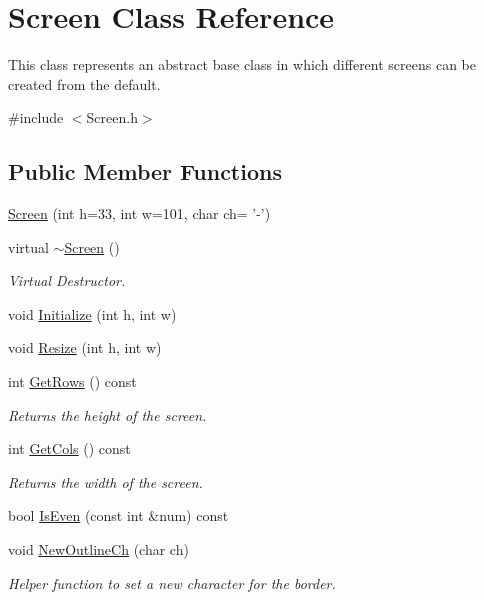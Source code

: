 \hypertarget{classScreen}{\section{Screen Class Reference}
\label{classScreen}
}


This class represents an abstract base class in which different screens can be created from the default.  




{\ttfamily \#include $<$Screen.\-h$>$}

\subsection*{Public Member Functions}
\begin{DoxyCompactItemize}
\item 
\hyperlink{classScreen_a932b81c3d221d644cc40ffe9003515a5}{Screen} (int h=33, int w=101, char ch= '-\/')
\item 
virtual \hyperlink{classScreen_a4243bc17596af96415b09ac48205676d}{$\sim$\-Screen} ()
\begin{DoxyCompactList}\small\item\em Virtual Destructor. \end{DoxyCompactList}\item 
void \hyperlink{classScreen_a455b38b1ac9b18bd67ecd2e056dff909}{Initialize} (int h, int w)
\item 
void \hyperlink{classScreen_a11f9842c836301989f7c3d84eb043700}{Resize} (int h, int w)
\item 
int \hyperlink{classScreen_aa12cc4ea36f5d2ac98b3c7334616acbc}{Get\-Rows} () const 
\begin{DoxyCompactList}\small\item\em Returns the height of the screen. \end{DoxyCompactList}\item 
int \hyperlink{classScreen_a223cd8821b2b8006c61545ff41aa0091}{Get\-Cols} () const 
\begin{DoxyCompactList}\small\item\em Returns the width of the screen. \end{DoxyCompactList}\item 
bool \hyperlink{classScreen_af7a18ec4e53fb371293e9ebcc23b7e2b}{Is\-Even} (const int \&num) const 
\item 
void \hyperlink{classScreen_a27dcfac6e64ab72059d0801dd9714d7a}{New\-Outline\-Ch} (char ch)
\begin{DoxyCompactList}\small\item\em Helper function to set a new character for the border. \end{DoxyCompactList}\item 

\end{DoxyCompactItemize}

